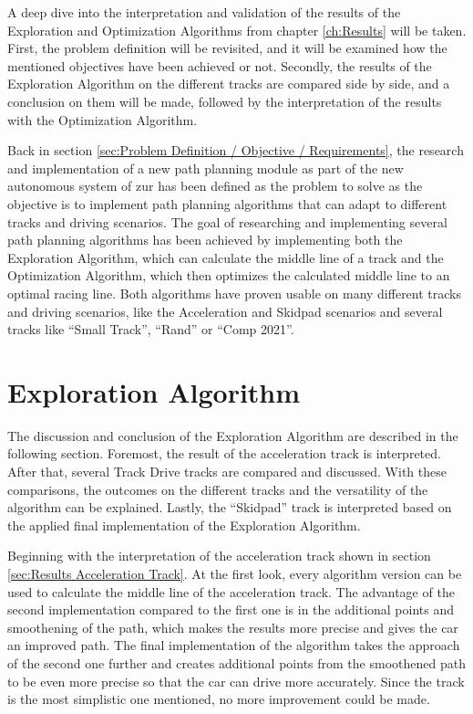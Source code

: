 A deep dive into the interpretation and validation of the results of the Exploration and Optimization Algorithms from chapter \ref{ch:Results} will be taken. First, the problem definition will be revisited, and it will be examined how the mentioned objectives have been achieved or not. Secondly, the results of the Exploration Algorithm on the different tracks are compared side by side, and a conclusion on them will be made, followed by the interpretation of the results with the Optimization Algorithm.

Back in section \ref{sec:Problem Definition / Objective / Requirements}, the research and implementation of a new path planning module as part of the new autonomous system of \acrlong{zur} has been defined as the problem to solve as the objective is to implement path planning algorithms that can adapt to different tracks and driving scenarios. The goal of researching and implementing several path planning algorithms has been achieved by implementing both the Exploration Algorithm, which can calculate the middle line of a track and the Optimization Algorithm, which then optimizes the calculated middle line to an optimal racing line. Both algorithms have proven usable on many different tracks and driving scenarios, like the Acceleration and Skidpad scenarios and several tracks like ``Small Track'', ``Rand'' or ``Comp 2021''.

\section{Exploration Algorithm}
The discussion and conclusion of the Exploration Algorithm are described in the following section. Foremost, the result of the acceleration track is interpreted. After that, several Track Drive tracks are compared and discussed. With these comparisons, the outcomes on the different tracks and the versatility of the algorithm can be explained. Lastly, the ``Skidpad'' track is interpreted based on the applied final implementation of the Exploration Algorithm.

Beginning with the interpretation of the acceleration track shown in section \ref{sec:Results Acceleration Track}. At the first look, every algorithm version can be used to calculate the middle line of the acceleration track. The advantage of the second implementation compared to the first one is in the additional points and smoothening of the path, which makes the results more precise and gives the car an improved path. The final implementation of the algorithm takes the approach of the second one further and creates additional points from the smoothened path to be even more precise so that the car can drive more accurately. Since the track is the most simplistic one mentioned, no more improvement could be made.

